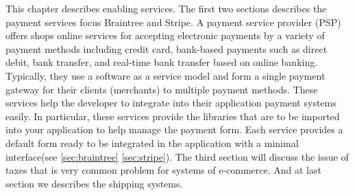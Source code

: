 This chapter describes enabling services.
\newline
The first two sections describes the payment services focus Braintree and Stripe.
\newline
A payment service provider (PSP) offers shops online services for accepting electronic payments by a variety of payment methods including credit card, bank-based payments such as direct debit, bank transfer, and real-time bank transfer based on online banking. Typically, they use a software as a service model and form a single payment gateway for their clients (merchants) to multiple payment methods.
\newline
These services help the developer to integrate into their application payment systems easily. In particular, these services provide the libraries that are to be imported into your application to help manage the payment form. Each service provides a default form ready to be integrated in the application with a minimal interface(see \ref{sec:braintree} \ref{sec:stripe}).
\newline
The third section will discuss the issue of taxes that is very common problem for systems of e-commerce. And at last section we describes the shipping systems.